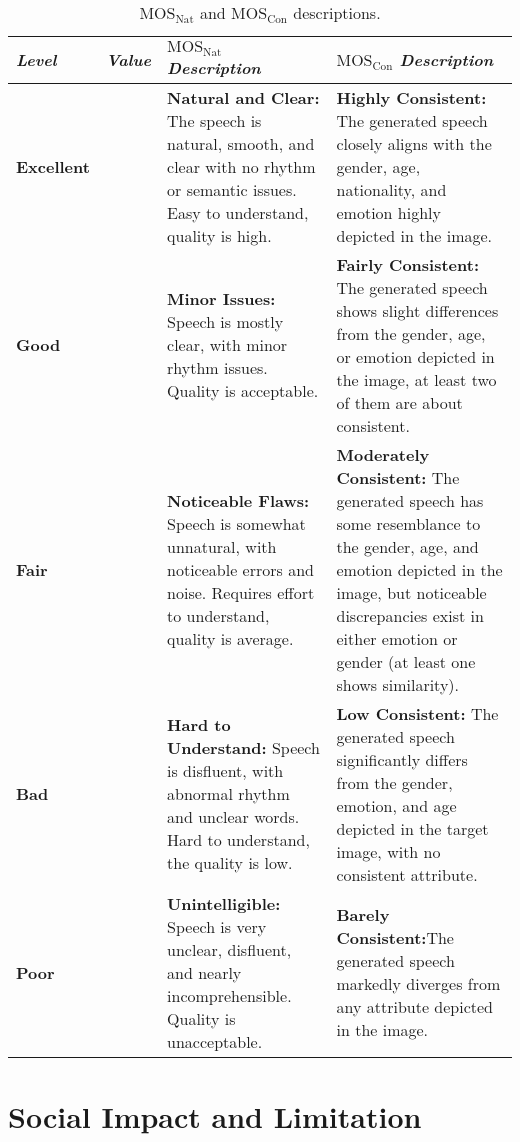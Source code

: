 \begin{table}[thbp]
\centering
\small
\begin{tabular}{>{\centering\arraybackslash}m{} >{\centering\arraybackslash}m{} p{6cm} p{6cm}}
\toprule
\textbf{\textit{Level}} & \textbf{\textit{Value}} & \textbf{$\text{MOS}_\text{Nat}$ \textit{ Description}} & \textbf{$\text{MOS}_\text{Con}$ \textit{ Description}} \\ 
\midrule
\textbf{Excellent} & 5 & \textbf{Natural and Clear:} The speech is natural, smooth, and clear with no rhythm or semantic issues. Easy to understand, quality is high. & \textbf{Highly Consistent:} The generated speech closely aligns with the gender, age, nationality, and emotion highly depicted in the image. \\ 
\textbf{Good} & 4 & \textbf{Minor Issues:} Speech is mostly clear, with minor rhythm issues. Quality is acceptable. & \textbf{Fairly Consistent:} The generated speech shows slight differences from the gender, age, or emotion depicted in the image, at least two of them are about consistent. \\ 
\textbf{Fair} & 3 & \textbf{Noticeable Flaws:} Speech is somewhat unnatural, with noticeable errors and noise. Requires effort to understand, quality is average. & \textbf{Moderately Consistent:} The generated speech has some resemblance to the gender, age, and emotion depicted in the image, but noticeable discrepancies exist in either emotion or gender (at least one shows similarity).\\ 
\textbf{Bad} & 2 & \textbf{Hard to Understand:} Speech is disfluent, with abnormal rhythm and unclear words. Hard to understand, the quality is low. & \textbf{Low Consistent:} The generated speech significantly differs from the gender, emotion, and age depicted in the target image, with no consistent attribute. \\ 
\textbf{Poor} & 1 & \textbf{Unintelligible:} Speech is very unclear, disfluent, and nearly incomprehensible. Quality is unacceptable. & \textbf{Barely Consistent:}The generated speech markedly diverges from any attribute depicted in the image. \\ 
\bottomrule
\end{tabular}
\caption{$\text{MOS}_\text{Nat}$ and $\text{MOS}_\text{Con}$ descriptions.}
\label{table:mos_smos}
\end{table}


\section{Social Impact and Limitation}
\label{sec:impact}
